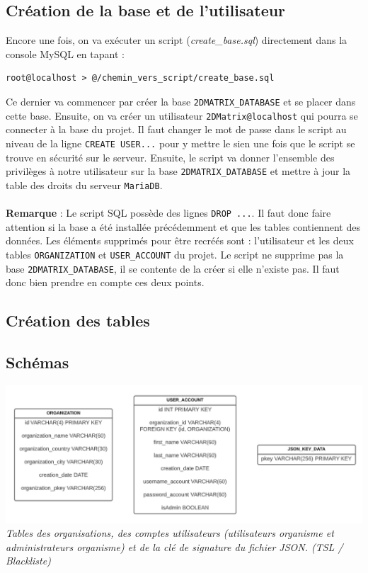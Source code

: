 \subsection{Création de la base et de l'utilisateur}
Encore une fois, on va exécuter un script (\textit{create\_base.sql}) directement dans la console MySQL en tapant :
\begin{verbatim}
root@localhost > @/chemin_vers_script/create_base.sql
\end{verbatim}
Ce dernier va commencer par créer la base \texttt{2DMATRIX\_DATABASE} et se placer dans cette base. Ensuite, on va créer 
un utilisateur \texttt{2DMatrix@localhost} qui pourra se connecter à la base du projet. Il faut changer le mot de passe dans le script au niveau de la ligne \texttt{CREATE USER...} pour y mettre le sien une fois que le script se trouve en sécurité sur le serveur. Ensuite, le script va donner l'ensemble des privilèges à notre utilisateur sur la base \texttt{2DMATRIX\_DATABASE} et mettre à jour la table des droits du serveur \texttt{MariaDB}.\\\\
\textbf{Remarque} : Le script SQL possède des lignes \texttt{DROP ...}. Il faut donc faire attention si la base a été installée précédemment et que les tables contiennent des données. Les éléments supprimés pour être recréés sont : l'utilisateur et les deux tables \texttt{ORGANIZATION} et \texttt{USER\_ACCOUNT} du projet. Le script ne supprime pas la base \texttt{2DMATRIX\_DATABASE}, il se contente de la créer si elle n'existe pas. Il faut donc bien prendre en compte ces deux points.

\subsection{Création des tables}
\subsection{Schémas}
\begin{center}
    \includegraphics[scale=0.6]{imgs/bdd.PNG}\\
    \textit{Tables des organisations, des comptes utilisateurs (utilisateurs organisme et administrateurs organisme) et de la clé de signature du fichier JSON. (TSL / Blackliste)}
\end{center}

